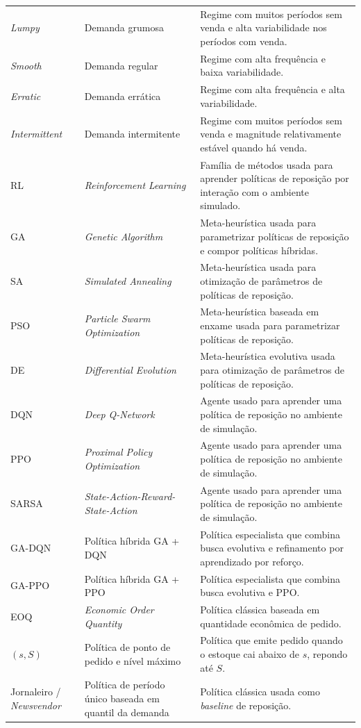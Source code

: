 \begin{longtable}{@{}>{\raggedright\arraybackslash}p{2.35cm}>{\raggedright\arraybackslash}p{5.05cm}>{\raggedright\arraybackslash}p{7.15cm}@{}}
\textit{Lumpy} & Demanda grumosa & Regime com muitos períodos sem venda e alta variabilidade nos períodos com venda. \\
\textit{Smooth} & Demanda regular & Regime com alta frequência e baixa variabilidade. \\
\textit{Erratic} & Demanda errática & Regime com alta frequência e alta variabilidade. \\
\textit{Intermittent} & Demanda intermitente & Regime com muitos períodos sem venda e magnitude relativamente estável quando há venda. \\
RL & \textit{Reinforcement Learning} & Família de métodos usada para aprender políticas de reposição por interação com o ambiente simulado. \\
GA & \textit{Genetic Algorithm} & Meta-heurística usada para parametrizar políticas de reposição e compor políticas híbridas. \\
SA & \textit{Simulated Annealing} & Meta-heurística usada para otimização de parâmetros de políticas de reposição. \\
PSO & \textit{Particle Swarm Optimization} & Meta-heurística baseada em enxame usada para parametrizar políticas de reposição. \\
DE & \textit{Differential Evolution} & Meta-heurística evolutiva usada para otimização de parâmetros de políticas de reposição. \\
DQN & \textit{Deep Q-Network} & Agente usado para aprender uma política de reposição no ambiente de simulação. \\
PPO & \textit{Proximal Policy Optimization} & Agente usado para aprender uma política de reposição no ambiente de simulação. \\
SARSA & \textit{State-Action-Reward-State-Action} & Agente usado para aprender uma política de reposição no ambiente de simulação. \\
GA-DQN & Política híbrida GA + DQN & Política especialista que combina busca evolutiva e refinamento por aprendizado por reforço. \\
GA-PPO & Política híbrida GA + PPO & Política especialista que combina busca evolutiva e PPO. \\
EOQ & \textit{Economic Order Quantity} & Política clássica baseada em quantidade econômica de pedido. \\
$(s,S)$ & Política de ponto de pedido e nível máximo & Política que emite pedido quando o estoque cai abaixo de $s$, repondo até $S$. \\
Jornaleiro / \textit{Newsvendor} & Política de período único baseada em quantil da demanda & Política clássica usada como \textit{baseline} de reposição. \\

\end{longtable}
